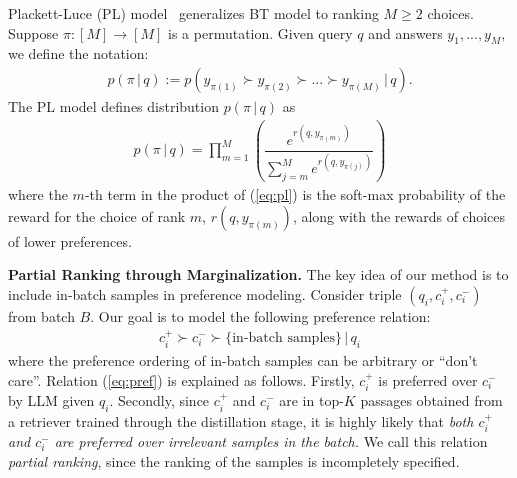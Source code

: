 Plackett-Luce (PL) model~\cite{plackett1975analysis, luce1959individual} generalizes BT model to ranking $M\geq 2$ choices. Suppose $\pi:[M]\to[M]$ is a permutation. Given query $q$ and  answers $y_1,...,y_M$, we define the notation: 
\begin{align*}
p(\pi\,|\,q):=p(y_{\pi(1)}\succ y_{\pi(2)} \succ ... \succ y_{\pi(M)}\,|\,q).
\end{align*}
The PL model defines distribution $p(\pi\,|\,q)$ as
\begin{align}\label{eq:pl}
   p(\pi \, |\, q) = \prod_{m=1}^M \left(\dfrac{e^{r(q, y_{\pi(m)})}}{\sum_{j=m}^M e^{r(q,y_{\pi(j)})}}\right)
\end{align}
where the $m$-th term in the product of (\ref{eq:pl}) is the soft-max probability of the reward for the choice of rank $m$, $r(q,y_{\pi(m)})$, along with the rewards of choices of lower preferences.

\noindent\textbf{Partial Ranking through Marginalization.} The key idea of our method is to include in-batch samples in preference modeling. Consider triple $(q_i, c_i^+, c_i^-)$ from batch $B$. Our goal is to model the following preference relation:
\begin{align}
c_i^+ \succ c_i^- \succ \{\text{in-batch samples}\}\,|\, q_i\label{eq:pref}
\end{align}
where the preference ordering of in-batch samples can be arbitrary or ``don't care''. Relation (\ref{eq:pref}) is explained as follows. Firstly, $c_i^+$ is preferred over $c_i^-$ by LLM given $q_i$. Secondly, since $c_i^+$ and $c_i^-$ are in top-$K$ passages obtained from a retriever trained through the distillation stage, it is highly likely that \emph{both $c_i^+$ and $c_i^-$ are preferred over irrelevant samples in the batch.} We call this relation \emph{partial ranking}, since the ranking of the samples is incompletely specified.

